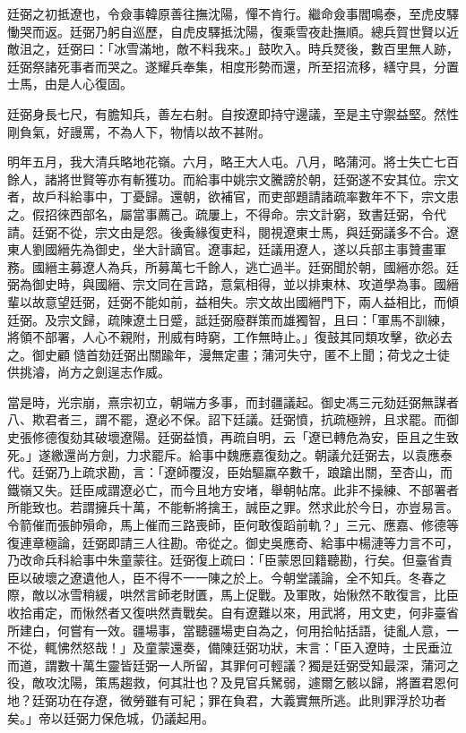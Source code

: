 \begin{pinyinscope}
廷弼之初抵遼也，令僉事韓原善往撫沈陽，憚不肯行。繼命僉事閻鳴泰，至虎皮驛慟哭而返。廷弼乃躬自巡歷，自虎皮驛抵沈陽，復乘雪夜赴撫順。總兵賀世賢以近敵沮之，廷弼曰：「冰雪滿地，敵不料我來。」鼓吹入。時兵燹後，數百里無人跡，廷弼祭諸死事者而哭之。遂耀兵奉集，相度形勢而還，所至招流移，繕守具，分置士馬，由是人心復固。

廷弼身長七尺，有膽知兵，善左右射。自按遼即持守邊議，至是主守禦益堅。然性剛負氣，好謾罵，不為人下，物情以故不甚附。

明年五月，我大清兵略地花嶺。六月，略王大人屯。八月，略蒲河。將士失亡七百餘人，諸將世賢等亦有斬獲功。而給事中姚宗文騰謗於朝，廷弼遂不安其位。宗文者，故戶科給事中，丁憂歸。還朝，欲補官，而吏部題請諸疏率數年不下，宗文患之。假招徠西部名，屬當事薦己。疏屢上，不得命。宗文計窮，致書廷弼，令代請。廷弼不從，宗文由是怨。後夤緣復吏科，閱視遼東士馬，與廷弼議多不合。遼東人劉國縉先為御史，坐大計謫官。遼事起，廷議用遼人，遂以兵部主事贊畫軍務。國縉主募遼人為兵，所募萬七千餘人，逃亡過半。廷弼聞於朝，國縉亦怨。廷弼為御史時，與國縉、宗文同在言路，意氣相得，並以排東林、攻道學為事。國縉輩以故意望廷弼，廷弼不能如前，益相失。宗文故出國縉門下，兩人益相比，而傾廷弼。及宗文歸，疏陳遼土日蹙，詆廷弼廢群策而雄獨智，且曰：「軍馬不訓練，將領不部署，人心不親附，刑威有時窮，工作無時止。」復鼓其同類攻擊，欲必去之。御史顧慥首劾廷弼出關踰年，漫無定畫；蒲河失守，匿不上聞；荷戈之士徒供挑濬，尚方之劍逞志作威。

當是時，光宗崩，熹宗初立，朝端方多事，而封疆議起。御史馮三元劾廷弼無謀者八、欺君者三，謂不罷，遼必不保。詔下廷議。廷弼憤，抗疏極辨，且求罷。而御史張修德復劾其破壞遼陽。廷弼益憤，再疏自明，云「遼已轉危為安，臣且之生致死。」遂繳還尚方劍，力求罷斥。給事中魏應嘉復劾之。朝議允廷弼去，以袁應泰代。廷弼乃上疏求勘，言：「遼師覆沒，臣始驅羸卒數千，踉蹌出關，至杏山，而鐵嶺又失。廷臣咸謂遼必亡，而今且地方安堵，舉朝帖席。此非不操練、不部署者所能致也。若謂擁兵十萬，不能斬將擒王，誠臣之罪。然求此於今日，亦豈易言。令箭催而張帥殞命，馬上催而三路喪師，臣何敢復蹈前軌？」三元、應嘉、修德等復連章極論，廷弼即請三人往勘。帝從之。御史吳應奇、給事中楊漣等力言不可，乃改命兵科給事中朱童蒙往。廷弼復上疏曰：「臣蒙恩回籍聽勘，行矣。但臺省責臣以破壞之遼遺他人，臣不得不一一陳之於上。今朝堂議論，全不知兵。冬春之際，敵以冰雪稍緩，哄然言師老財匱，馬上促戰。及軍敗，始愀然不敢復言，比臣收拾甫定，而愀然者又復哄然責戰矣。自有遼難以來，用武將，用文吏，何非臺省所建白，何嘗有一效。疆場事，當聽疆場吏自為之，何用拾帖括語，徒亂人意，一不從，輒怫然怒哉！」及童蒙還奏，備陳廷弼功狀，末言：「臣入遼時，士民垂泣而道，謂數十萬生靈皆廷弼一人所留，其罪何可輕議？獨是廷弼受知最深，蒲河之役，敵攻沈陽，策馬趨救，何其壯也？及見官兵駑弱，遽爾乞骸以歸，將置君恩何地？廷弼功在存遼，微勞雖有可紀；罪在負君，大義實無所逃。此則罪浮於功者矣。」帝以廷弼力保危城，仍議起用。


\end{pinyinscope}

